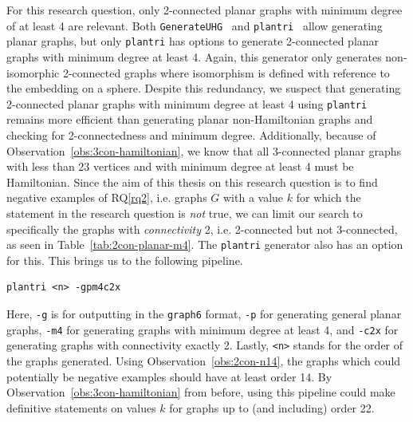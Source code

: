 For this research question, only 2-connected planar graphs with minimum degree of at least 4 are relevant. Both \texttt{GenerateUHG}~\cite{lib:UHG} and \texttt{plantri}~\cite{lib:plantri} allow generating planar graphs, but only \texttt{plantri} has options to generate 2-connected planar graphs with minimum degree at least 4. Again, this generator only generates non-isomorphic 2-connected graphs where isomorphism is defined with reference to the embedding on a sphere. Despite this redundancy, we suspect that generating 2-connected planar graphs with minimum degree at least 4 using \texttt{plantri} remains more efficient than generating planar non-Hamiltonian graphs and checking for 2-connectedness and minimum degree. Additionally, because of Observation~\ref{obs:3con-hamiltonian}, we know that all 3-connected planar graphs with less than 23 vertices and with minimum degree at least 4 must be Hamiltonian. Since the aim of this thesis on this research question is to find negative examples of RQ\ref{rq2}, i.e. graphs $G$ with a value $k$ for which the statement in the research question is \textit{not} true, we can limit our search to specifically the graphs with \textit{connectivity} 2, i.e. 2-connected but not 3-connected, as seen in Table~\ref{tab:2con-planar-m4}. The \texttt{plantri} generator also has an option for this. This brings us to the following pipeline.
\begin{verbatim}
plantri <n> -gpm4c2x
\end{verbatim}
Here, \texttt{-g} is for outputting in the \texttt{graph6} format, \texttt{-p} for generating general planar graphs, \texttt{-m4} for generating graphs with minimum degree at least 4, and \texttt{-c2x} for generating graphs with connectivity exactly 2. Lastly, \texttt{<n>} stands for the order of the graphs generated. Using Observation~\ref{obs:2con-n14}, the graphs which could potentially be negative examples should have at least order 14. By Observation~\ref{obs:3con-hamiltonian} from before, using this pipeline could make definitive statements on values $k$ for graphs up to (and including) order 22.

